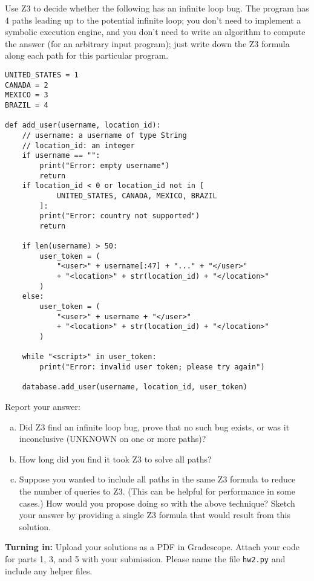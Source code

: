 \documentclass{article}
\begin{document}
\begin{enumerate}
Use Z3 to decide whether the following has an infinite loop bug.
The program has 4 paths leading up to the potential infinite loop; you don't need to implement a symbolic execution engine, and you don't need to write an algorithm to compute the answer (for an arbitrary input program); just write down the Z3 formula along each path for this particular program.

\begin{verbatim}
UNITED_STATES = 1
CANADA = 2
MEXICO = 3
BRAZIL = 4

def add_user(username, location_id):
    // username: a username of type String
    // location_id: an integer
    if username == "":
        print("Error: empty username")
        return
    if location_id < 0 or location_id not in [
            UNITED_STATES, CANADA, MEXICO, BRAZIL
        ]:
        print("Error: country not supported")
        return

    if len(username) > 50:
        user_token = (
            "<user>" + username[:47] + "..." + "</user>"
            + "<location>" + str(location_id) + "</location>"
        )
    else:
        user_token = (
            "<user>" + username + "</user>"
            + "<location>" + str(location_id) + "</location>"
        )

    while "<script>" in user_token:
        print("Error: invalid user token; please try again")

    database.add_user(username, location_id, user_token)

\end{verbatim}

Report your answer:

\begin{enumerate}[(a)]
\item Did Z3 find an infinite loop bug, prove that no such bug exists, or was it inconclusive (UNKNOWN on one or more paths)?
\item How long did you find it took Z3 to solve all paths?
\item Suppose you wanted to include all paths in the same Z3 formula to reduce the number of queries to Z3.
(This can be helpful for performance in some cases.) How would you propose doing so with the above technique?
Sketch your answer by providing a single Z3 formula that would result from this solution.
\end{enumerate}

\end{enumerate}

\noindent
\textbf{Turning in:}
Upload your solutions as a PDF in Gradescope.
Attach your code for parts 1, 3, and 5 with your submission.
Please name the file \texttt{hw2.py} and include any helper files.
\end{document}
